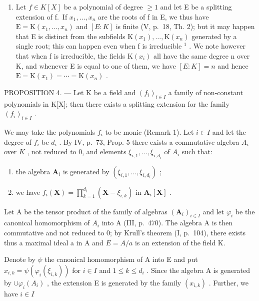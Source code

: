 \begin{enumerate}
\def\labelenumi{\arabic{enumi})}
\setcounter{enumi}{2}
\tightlist
\item
  Let \(f \in K[X]\) be a polynomial of degree \(\geqslant 1\) and let E be a splitting extension of f.~If \(x_{1}, \ldots, x_{n}\) are the roots of f in E, we thus have \(\mathrm{E} = \mathrm{K}(x_{1}, \ldots, x_{n})\) and \([E : K]\) is finite (V, p.~18, Th. 2); but it may happen that E is distinct from the subfields \(\mathrm{K}(x_{1}), \ldots, \mathrm{K}(x_{n})\) generated by a single root; this can happen even when f is irreducible \(^{1}\) . We note however that when f is irreducible, the fields \(\mathrm{K}(x_{i})\) all have the same degree n over K, and whenever E is equal to one of them, we have \([E : K] = n\) and hence \(\mathrm{E} = \mathrm{K}(x_{1}) = \cdots = \mathrm{K}(x_{n})\) .
\end{enumerate}

PROPOSITION 4. --- Let K be a field and \((f_{i})_{i\in I}\) a family of non-constant polynomials in K{[}X{]}; then there exists a splitting extension for the family \((f_{i})_{i\in I}\) .

We may take the polynomials \(f_{i}\) to be monic (Remark 1). Let \(i \in I\) and let the degree of \(f_{i}\) be \(d_{i}\) . By IV, p.~73, Prop. 5 there exists a commutative algebra \(A_{i}\) over \(K\) , not reduced to 0, and elements \(\xi_{i,1}, \ldots, \xi_{i,d_{i}}\) of \(A_{i}\) such that:

\begin{enumerate}
\def\labelenumi{\alph{enumi})}
\item
  the algebra \(\mathbf{A}_i\) is generated by \((\xi_{i,1},\dots,\xi_{i,d_i})\) ;
\item
  we have \(f_{i}(\mathbf{X}) = \prod_{k=1}^{d_{i}} (\mathbf{X} - \xi_{i,k})\) in \(\mathbf{A}_i[\mathbf{X}]\) .
\end{enumerate}

Let A be the tensor product of the family of algebras \((\mathbf{A}_{i})_{i\in I}\) and let \(\varphi_{i}\) be the canonical homomorphism of \(A_{i}\) into A (III, p.~470). The algebra A is then commutative and not reduced to 0; by Krull's theorem (I, p.~104), there exists thus a maximal ideal a in A and \(E = A/a\) is an extension of the field K.

Denote by \(\psi\) the canonical homomorphism of A into E and put \(x_{i,k} = \psi (\varphi_i(\xi_{i,k}))\) for \(i\in I\) and \(1\leqslant k\leqslant d_i\) . Since the algebra A is generated by \(\cup \varphi_i(A_i)\) , the extension E is generated by the family \((x_{i,k})\) . Further, we have \(i\in I\)

